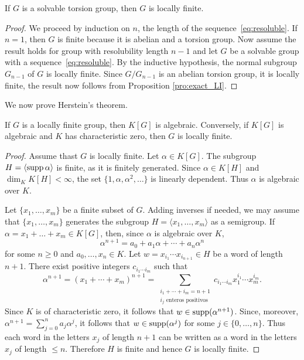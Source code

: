 \begin{proposition}
	If $G$ is a solvable torsion group, 
	then $G$ is locally finite. 
\end{proposition}

\begin{proof}
	We proceed by induction on $n$, the length of the sequence~\eqref{eq:resoluble}. 
	If $n=1$, then $G$ is finite because it is abelian and a torsion group.
	Now assume the result holds for group with resolubility length $n-1$ and let
	$G$ be a solvable group with a sequence~\eqref{eq:resoluble}. By the inductive hypothesis, 
	the normal subgroup $G_{n-1}$ of $G$ is locally finite. Since $G/G_{n-1}$ is an abelian torsion group, 
	it is locally finite, the result now follows from Proposition \ref{pro:exact_LI}.
\end{proof}

We now prove Herstein's theorem.

\begin{theorem}[Herstein]
	If $G$ is a locally finite group, then $K[G]$ is algebraic. Conversely, if 
	$K[G]$ is algebraic and $K$ has characteristic zero, then $G$ 
	is locally finite. 
\end{theorem}

\begin{proof}
	Assume thast $G$ is locally finite. Let $\alpha\in K[G]$. The subgroup 
	$H=\langle\operatorname{supp}\alpha\rangle$ is finite, as it is finitely generated. Since 
	$\alpha\in K[H]$ and $\dim_KK[H]<\infty$, the set 
	$\{1,\alpha,\alpha^2,\dots\}$ is linearly dependent. Thus $\alpha$ is
	algebraic over $K$.

	Let $\{x_1,\dots,x_m\}$ be a finite subset of $G$. Adding inverses if needed,
	we may assume that $\{x_1,\dots,x_m\}$ generates the subgroup 
	$H=\langle x_1,\dots,x_m\rangle$ as a semigroup. If
	$\alpha=x_1+\dots+x_m\in K[G]$, then, since $\alpha$ is algebraic over $K$, 
	\[
		\alpha^{n+1}=a_0+a_1\alpha+\cdots+a_n\alpha^n
	\]
	for some $n\geq0$ and $a_0,\dots,x_n\in K$. Let $w=x_{i_1}\cdots
	x_{i_{n+1}}\in H$ be a word of length $n+1$. There exist positive integers 
	$c_{i_1\cdots i_m}$ such that 
	\[
		\alpha^{n+1}=(x_1+\cdots+x_m)^{n+1}
		=\sum_{\substack{{i_1+\cdots+i_m=n+1}\\{\text{$i_j$ enteros positivos}}}} c_{i_1\cdots i_m}x_1^{i_1}\cdots x_{m}^{i_m}.
	\]
	Since $K$
	is of characteristic zero, it follows that $w\in\operatorname{supp}(\alpha^{n+1})$. Since, moreover,  
	$\alpha^{n+1}=\sum_{j=0}^na_j\alpha^j$, it follows that 
	$w\in\operatorname{supp}(\alpha^j)$ for some $j\in\{0,\dots,n\}$. Thus each
	word in the letters $x_j$ of length $n+1$ can be written as a word in the letters $x_j$ of 
	length $\leq n$. Therefore $H$ is finite and hence $G$ is locally finite. 
\end{proof}

